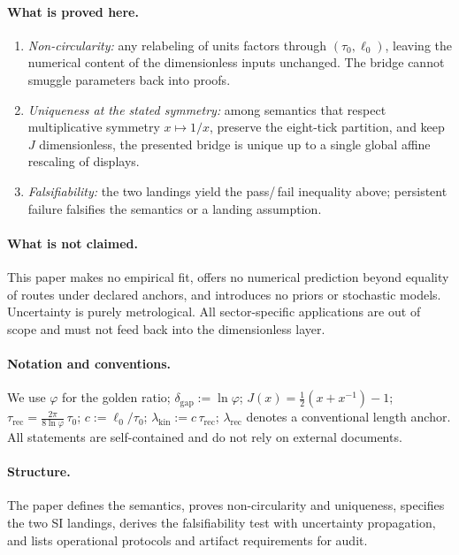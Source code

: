 \documentclass[11pt]{article}
\theoremstyle{plain}
\theoremstyle{definition}
\theoremstyle{remark}
\begin{document}
\paragraph{What is proved here.}
\begin{enumerate}
  \item \emph{Non-circularity:} any relabeling of units factors through \((\tau_{0},\ell_{0})\), leaving the numerical content of the dimensionless inputs unchanged. The bridge cannot smuggle parameters back into proofs.
  \item \emph{Uniqueness at the stated symmetry:} among semantics that respect multiplicative symmetry \(x\mapsto 1/x\), preserve the eight-tick partition, and keep \(J\) dimensionless, the presented bridge is unique up to a single global affine rescaling of displays.
  \item \emph{Falsifiability:} the two landings yield the pass/\,fail inequality above; persistent failure falsifies the semantics or a landing assumption.
\end{enumerate}

\paragraph{What is not claimed.}
This paper makes no empirical fit, offers no numerical prediction beyond equality of routes under declared anchors, and introduces no priors or stochastic models. Uncertainty is purely metrological. All sector-specific applications are out of scope and must not feed back into the dimensionless layer.

\paragraph{Notation and conventions.}
We use \(\varphi\) for the golden ratio; \(\delta_{\mathrm{gap}}:=\ln\varphi\); \(J(x)=\tfrac12(x+x^{-1})-1\); \(\tau_{\mathrm{rec}}=\frac{2\pi}{8\ln\varphi}\,\tau_{0}\); \(c:=\ell_{0}/\tau_{0}\); \(\lambda_{\mathrm{kin}}:=c\,\tau_{\mathrm{rec}}\); \(\lambda_{\mathrm{rec}}\) denotes a conventional length anchor. All statements are self-contained and do not rely on external documents.

\paragraph{Structure.}
The paper defines the semantics, proves non-circularity and uniqueness, specifies the two SI landings, derives the falsifiability test with uncertainty propagation, and lists operational protocols and artifact requirements for audit.
\end{document}
